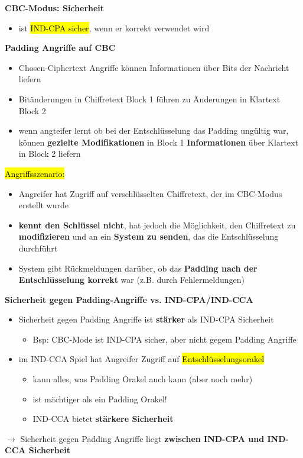 \documentclass[a4paper, 10pt]{article}
\begin{document}
\noindent\textbf{CBC-Modus: Sicherheit}
\begin{itemize}
    \item ist \hl{IND-CPA sicher}, wenn er korrekt verwendet wird
\end{itemize}

\noindent\textbf{Padding Angriffe auf CBC}
\begin{itemize}
    \item Chosen-Ciphertext Angriffe können Informationen über Bits der Nachricht liefern
    \item Bitänderungen in Chiffretext Block 1 führen zu Änderungen in Klartext Block 2
    \item wenn angteifer lernt ob bei der Entschlüsselung das Padding ungültig war, können \textbf{gezielte Modifikationen} in Block 1 \textbf{Informationen} über Klartext in Block 2 liefern
\end{itemize}
\hl{Angriffsszenario:}
\begin{itemize}
    \item Angreifer hat Zugriff auf verschlüsselten Chiffretext, der im CBC-Modus erstellt wurde
    \item \textbf{kennt den Schlüssel nicht}, hat jedoch die Möglichkeit, den Chiffretext zu \textbf{modifizieren} und an ein \textbf{System zu senden}, das die Entschlüsselung durchführt
    \item System gibt Rückmeldungen darüber, ob das \textbf{Padding nach der Entschlüsselung korrekt} war (z.B. durch Fehlermeldungen)
\end{itemize}
\textbf{Sicherheit gegen Padding-Angriffe vs. IND-CPA/IND-CCA}
\begin{itemize}
    \item Sicherheit gegen Padding Angriffe ist \textbf{stärker} als IND-CPA Sicherheit 
    \begin{itemize}
        \item Bsp: CBC-Mode ist IND-CPA sicher, aber nicht gegem Padding Angriffe
    \end{itemize}

    \item im IND-CCA Spiel hat Angreifer Zugriff auf \hl{Entschlüsselungsorakel}
    \begin{itemize}
        \item kann alles, was Padding Orakel auch kann (aber noch mehr)
        \item ist mächtiger als ein Padding Orakel!
        \item IND-CCA bietet \textbf{stärkere Sicherheit}
    \end{itemize}
\end{itemize}
$\rightarrow$ Sicherheit gegen Padding Angriffe liegt \textbf{zwischen IND-CPA und IND-CCA Sicherheit}
\end{document}
